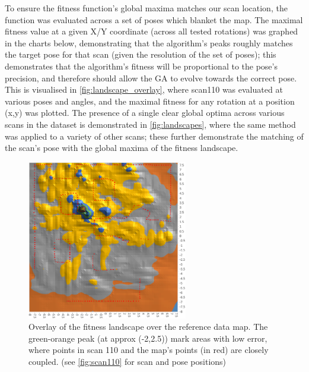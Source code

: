 \documentclass[authoryearcitations]{UoYCSproject}
\begin{document}
To ensure the fitness function's global maxima matches our scan location, the function was evaluated across a set of poses which blanket the map. The maximal fitness value at a given X/Y coordinate (across all tested rotations) was graphed in the charts below, demonstrating that the algorithm's peaks roughly matches the target pose for that scan (given the resolution of the set of poses); this demonstrates that the algorithm's fitness will be proportional to the pose's precision, and therefore should allow the GA to evolve towards the correct pose. This is visualised in \autoref{fig:landscape_overlay}, where scan110 was evaluated at various poses and angles, and the maximal fitness for any rotation at a position (x,y) was plotted. The presence of a single clear global optima across various scans in the dataset is demonstrated in \autoref{fig:landscapes}, where the same method was applied to a variety of other scans; these further demonstrate the matching of the scan's pose with the global maxima of the fitness landscape. 

\begin{figure}[ht]
\centering
	\includegraphics[width=7cm,keepaspectratio]{images/landscape_overlay.png}
	\caption{Overlay of the fitness landscape over the reference data map. The green-orange peak (at approx (-2,2.5)) mark areas with low error, where points in scan 110 and the map's points (in red) are closely coupled. (see \autoref{fig:scan110} for scan and pose positions)}
	\label{fig:landscape_overlay}
\end{figure}
\end{document}
